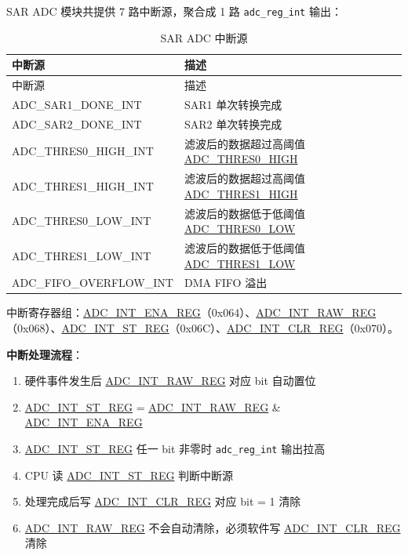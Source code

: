 \documentclass[main\_\_CN.tex]{subfiles}
\begin{document}
SAR ADC 模块共提供 7 路中断源，聚合成 1 路 \verb+adc_reg_int+ 输出：

\begin{longtable}[c]{|l|L{9 cm}|}
    \caption{SAR ADC 中断源}\label{tab:adc-intr}\\\hline
    中断源 & 描述 \\\hline
    \endfirsthead
    \hline
        中断源 & 描述\\\hline
    \endhead
    \endfoot

    \label{interreupt:ADCSAR1DONEINT}ADC\_SAR1\_DONE\_INT & SAR1 单次转换完成 \\\hline
    \label{interreupt:ADCSAR2DONEINT}ADC\_SAR2\_DONE\_INT & SAR2 单次转换完成 \\\hline
    \label{interreupt:ADCTHRES0HIGHINT}ADC\_THRES0\_HIGH\_INT & 滤波后的数据超过高阈值 \hyperref[fielddesc:ADCTHRES0HIGH]{ADC\_THRES0\_HIGH} \\\hline
    \label{interreupt:ADCTHRES1HIGHINT}ADC\_THRES1\_HIGH\_INT & 滤波后的数据超过高阈值 \hyperref[fielddesc:ADCTHRES1HIGH]{ADC\_THRES1\_HIGH} \\\hline
    \label{interreupt:ADCTHRES0LOWINT}ADC\_THRES0\_LOW\_INT & 滤波后的数据低于低阈值 \hyperref[fielddesc:ADCTHRES0LOW]{ADC\_THRES0\_LOW} \\\hline
    \label{interreupt:ADCTHRES1LOWINT}ADC\_THRES1\_LOW\_INT & 滤波后的数据低于低阈值 \hyperref[fielddesc:ADCTHRES1LOW]{ADC\_THRES1\_LOW} \\\hline
    \label{interreupt:ADCFIFOOVERFLOWINT}ADC\_FIFO\_OVERFLOW\_INT & DMA FIFO 溢出 \\\hline

\end{longtable}

中断寄存器组：\hyperref[regdesc:ADCINTENAREG]{ADC\_INT\_ENA\_REG}（0x064）、\hyperref[regdesc:ADCINTRAWREG]{ADC\_INT\_RAW\_REG}（0x068）、\hyperref[regdesc:ADCINTSTREG]{ADC\_INT\_ST\_REG}（0x06C）、\hyperref[regdesc:ADCINTCLRREG]{ADC\_INT\_CLR\_REG}（0x070）。

\textbf{中断处理流程}：
\begin{enumerate}
    \item 硬件事件发生后 \hyperref[regdesc:ADCINTRAWREG]{ADC\_INT\_RAW\_REG} 对应 bit 自动置位
    \item \hyperref[regdesc:ADCINTSTREG]{ADC\_INT\_ST\_REG} = \hyperref[regdesc:ADCINTRAWREG]{ADC\_INT\_RAW\_REG} \& \hyperref[regdesc:ADCINTENAREG]{ADC\_INT\_ENA\_REG}
    \item \hyperref[regdesc:ADCINTSTREG]{ADC\_INT\_ST\_REG} 任一 bit 非零时 \verb+adc_reg_int+ 输出拉高
    \item CPU 读 \hyperref[regdesc:ADCINTSTREG]{ADC\_INT\_ST\_REG} 判断中断源
    \item 处理完成后写 \hyperref[regdesc:ADCINTCLRREG]{ADC\_INT\_CLR\_REG} 对应 bit = 1 清除
    \item \hyperref[regdesc:ADCINTRAWREG]{ADC\_INT\_RAW\_REG} 不会自动清除，必须软件写 \hyperref[regdesc:ADCINTCLRREG]{ADC\_INT\_CLR\_REG} 清除
\end{enumerate}
\end{document}
